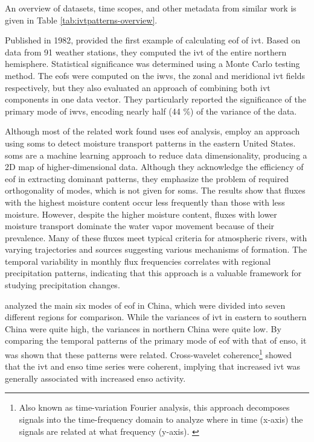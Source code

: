 An overview of datasets, time scopes, and other metadata from similar work is given in Table \ref{tab:ivtpatterns-overview}.

Published in 1982,  provided the first example of calculating \ac{eof} of \ac{ivt}. 
Based on data from 91 weather stations, they computed the \ac{ivt} of the entire northern hemisphere. 
Statistical significance was determined using a Monte Carlo testing method. 
The \acp{eof} were computed on the \acp{iwv}, the zonal and meridional \ac{ivt} fields respectively, but they also evaluated an approach of combining both \ac{ivt} components in one data vector. 
They particularly reported the significance of the primary mode of \acp{iwv}, encoding nearly half (44 \%) of the variance of the data.

Although most of the related work found uses \ac{eof} analysis, \citeauthor{teale_patterns_2020} employ an approach using \acp{som} to detect moisture transport patterns in the eastern United States.
\acp{som} are a machine learning approach to reduce data dimensionality, producing a 2D map of higher-dimensional data.
Although they acknowledge the efficiency of \ac{eof} in extracting dominant patterns, they emphasize the problem of required orthogonality of modes, which is not given for \acp{som}. 
The results show that fluxes with the highest moisture content occur less frequently than those with less moisture. 
However, despite the higher moisture content, fluxes with lower moisture transport dominate the water vapor movement because of their prevalence. 
Many of these fluxes meet typical criteria for atmospheric rivers, with varying trajectories and sources suggesting various mechanisms of formation. 
The temporal variability in monthly flux frequencies correlates with regional precipitation patterns, indicating that this approach is a valuable framework for studying precipitation changes. \cite{teale_patterns_2020}



\citeauthor{ayantobo_integrated_2022} analyzed the main six modes of \ac{eof} in China, which were divided into seven different regions for comparison. 
While the variances of \ac{ivt} in eastern to southern China were quite high, the variances in northern China were quite low. 
By comparing the temporal patterns of the primary mode of \ac{eof} with that of \ac{enso}, it was shown that these patterns were related. 
Cross-wavelet coherence\footnote{Also known as time-variation Fourier analysis, this approach decomposes signals into the time-frequency domain to analyze where in time (x-axis) the signals are related at what frequency (y-axis). \cite{ayantobo_integrated_2022}} showed that the \ac{ivt} and \ac{enso} time series were coherent, implying that increased \ac{ivt} was generally associated with increased \ac{enso} activity. \cite{ayantobo_integrated_2022} 


